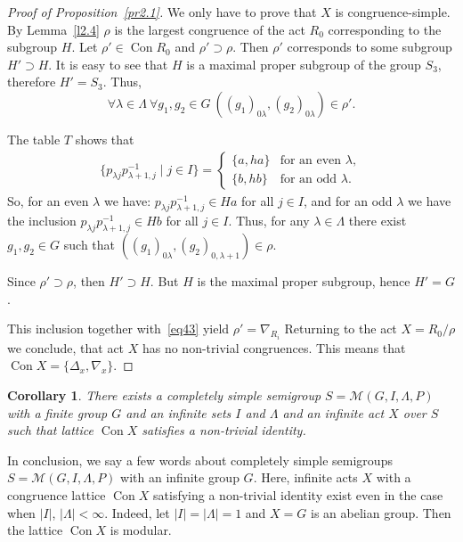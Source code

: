 \documentclass{birkau}
\numberwithin{equation}{section}
\theoremstyle{plain}
\newtheorem{corollary}[theorem]{Corollary}
\theoremstyle{definition}
\DeclareMathOperator{\Con}{Con}
\begin{document}
\begin{proof}[Proof of Proposition~\ref{pr2.1}]
		We only have to prove that $X$ is congruence-simple. By Lemma~\ref{l2.4} $\rho$ is the largest congruence of the act $R_0$ corresponding to the subgroup $H$. Let $\rho' \in \Con R_0$ and $\rho' \supset \rho$. Then $\rho'$ corresponds to some subgroup $H' \supset H$. It is easy to see that $H$ is a maximal proper subgroup of the group $S_3$, therefore $H' = S_3$. Thus,
		\begin{equation}
		    \forall \lambda \in \Lambda \ \forall g_1,g_2 \in G \ ((g_1)_{0 \lambda},(g_2)_{0 \lambda}) \in \rho'. \label{eq43}
		\end{equation}
		
		The table $T$ shows that
		\begin{gather*}
		\{ p_{\lambda j} p_{\lambda+1,j}^{-1} \mid j \in I \} =
			\begin{cases}
				\{a, ha\} & \text{for an even $\lambda$},\\
				\{b, hb\} & \text{for an odd $\lambda$}.
			\end{cases}
		\end{gather*}
		So, for an even $\lambda$ we have: $p_{\lambda j} p_{\lambda+1,j}^{-1} \in Ha$ for all $j \in I$, and for an odd $\lambda$ we have the inclusion $p_{\lambda j} p_{\lambda+1,j}^{-1} \in Hb$ for all $j \in I$. Thus, for any $\lambda \in \Lambda$ there exist $g_1,g_2 \in G$ such that $((g_1)_{0 \lambda},(g_2)_{0,\lambda+1}) \in \rho$.
		
		Since $\rho' \supset \rho$, then $H' \supset H$. But $H$ is the maximal proper subgroup, hence $H' = G$.
		
		This inclusion together with~\eqref{eq43} yield $\rho' = \nabla_{R_i}$ Returning to the act $X = {R_0}/{\rho}$ we conclude, that act $X$ has no non-trivial congruences. This means that $\Con X = \{ \Delta_x,\nabla_x \}$.
	\end{proof}
		
	\begin{corollary}
		There exists a completely simple semigroup \newline $S = \mathcal{M}(G,I,\Lambda,P)$ with a finite group $G$ and an infinite sets $I$ and $\Lambda$ and an infinite act $X$ over $S$ such that lattice $\Con X$ satisfies a non-trivial identity.
	\end{corollary}
	
	In conclusion, we say a few words about completely simple semigroups $S = \mathcal{M}(G,I,\Lambda,P)$ with an infinite group $G$. Here, infinite acts $X$ with a congruence lattice $\Con X$ satisfying a non-trivial identity exist even in the case when $|I|$, $|\Lambda| < \infty$. Indeed, let $|I| = |\Lambda| = 1$ and $X=G$ is an abelian group. Then the lattice $\Con X$ is modular.
	
\end{document}

